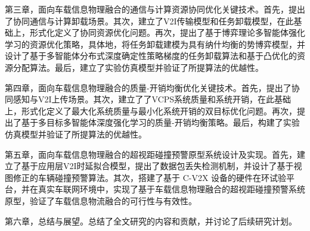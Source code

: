 第三章，面向车载信息物理融合的通信与计算资源协同优化关键技术。首先，提出了协同通信与计算卸载场景。其次，建立了V2I传输模型和任务卸载模型，在此基础上，形式化定义了协同资源优化问题。再次，提出了基于博弈理论多智能体强化学习的资源优化策略，具体地，将任务卸载建模为具有纳什均衡的势博弈模型，并设计了基于多智能体分布式深度确定性策略梯度的任务卸载算法和基于凸优化的资源分配算法。最后，建立了实验仿真模型并验证了所提算法的优越性。

第四章，面向车载信息物理融合的质量-开销均衡优化关键技术。首先，提出了协同感知与V2I上传场景。其次，建立了了VCPS系统质量和系统开销，在此基础上，形式化定义了最大化系统质量与最小化系统开销的双目标优化问题。再次，提出了基于多目标多智能体深度强化学习的质量-开销均衡策略。最后，构建了实验仿真模型并验证了所提算法的优越性。

第五章，面向车载信息物理融合的超视距碰撞预警原型系统设计及实现。首先，建立了基于应用层V2I时延拟合模型，提出了数据包丢失检测机制，并设计了基于视图修正的车辆碰撞预警算法。其次，搭建了基于 C-V2X 设备的硬件在环试验平台，并在真实车联网环境中，实现了基于车载信息物理融合的超视距碰撞预警系统原型，验证了车载信息物流融合的可行性与有效性。

第六章，总结与展望。总结了全文研究的内容和贡献，并讨论了后续研究计划。






